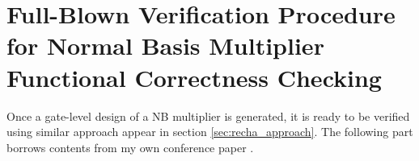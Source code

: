 % 
% 
% 
% 
% 

\section{Full-Blown Verification Procedure for Normal Basis Multiplier Functional Correctness Checking}
Once a gate-level design of a NB multiplier is generated, it is ready to be verified using 
similar approach appear in section \ref{sec:recha_approach}. The following part borrows contents
from my own conference paper \cite{myDATE}.
